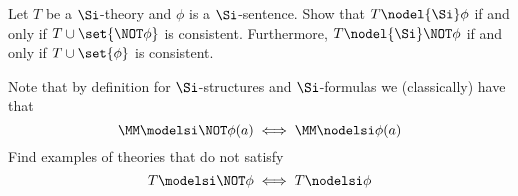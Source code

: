


\begin{ex}
    Let $T$ be a $\Si$-theory
    and $\phi$ is a $\Si$-sentence.
    Show that $T \nodel{\Si} \phi$
    if and only if $T \cup \set{ \NOT \phi}$ is consistent.
    Furthermore, $T \nodel{\Si} \NOT \phi$
    if and only if $T \cup \set{\phi}$ is consistent.

    Note that by definition for $\Si$-structures and
    $\Si$-formulas we (classically) have that
    \[
        \MM \modelsi \NOT \phi(a) \iff \MM \nodelsi \phi(a)
    \]
    Find examples of theories that do not satisfy
    \[
        T \modelsi \NOT \phi \iff T \nodelsi \phi
    \]
\end{ex}

